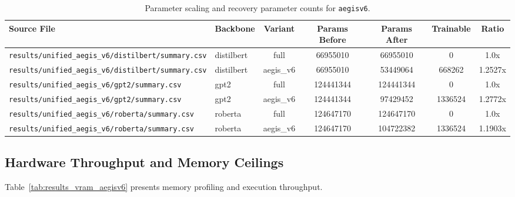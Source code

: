 \begin{table}[t]
\centering
\small
\begin{tabular}{llccccc}
\toprule
\textbf{Source File} & \textbf{Backbone} & \textbf{Variant} & \textbf{Params Before} & \textbf{Params After} & \textbf{Trainable} & \textbf{Ratio} \\
\midrule
\texttt{results/unified\_aegis\_v6/distilbert/summary.csv} & distilbert & full & 66955010 & 66955010 & 0 & 1.0x \\
\texttt{results/unified\_aegis\_v6/distilbert/summary.csv} & distilbert & aegis\_v6 & 66955010 & 53449064 & 668262 & 1.2527x \\
\texttt{results/unified\_aegis\_v6/gpt2/summary.csv} & gpt2 & full & 124441344 & 124441344 & 0 & 1.0x \\
\texttt{results/unified\_aegis\_v6/gpt2/summary.csv} & gpt2 & aegis\_v6 & 124441344 & 97429452 & 1336524 & 1.2772x \\
\texttt{results/unified\_aegis\_v6/roberta/summary.csv} & roberta & full & 124647170 & 124647170 & 0 & 1.0x \\
\texttt{results/unified\_aegis\_v6/roberta/summary.csv} & roberta & aegis\_v6 & 124647170 & 104722382 & 1336524 & 1.1903x \\
\bottomrule
\end{tabular}
\caption{Parameter scaling and recovery parameter counts for \texttt{aegisv6}.}
\label{tab:results_params_aegisv6}
\end{table}

\subsection{Hardware Throughput and Memory Ceilings}
Table~\ref{tab:results_vram_aegisv6} presents memory profiling and execution throughput.

